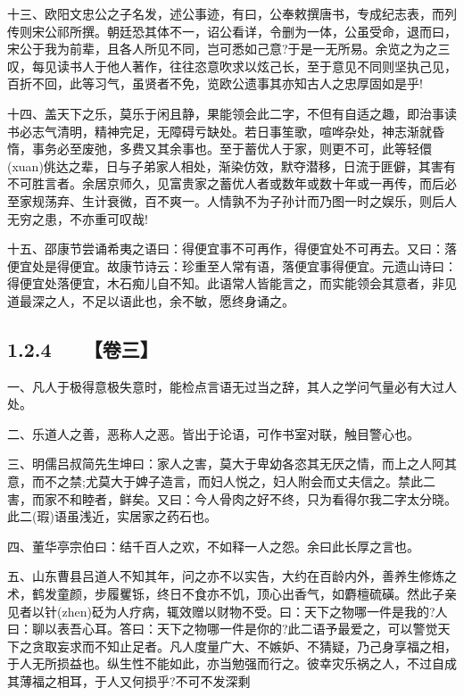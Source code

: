 \documentclass[letterpaper,12pt,english]{sphinxmanual}
\begin{document}
十三、欧阳文忠公之子名发，述公事迹，有曰，公奉敕撰唐书，专成纪志表，而列传则宋公祁所撰。朝廷恐其体不一，诏公看详，令删为一体，公虽受命，退而曰，宋公于我为前辈，且各人所见不同，岂可悉如己意?于是一无所易。余览之为之三叹，每见读书人于他人著作，往往恣意吹求以炫己长，至于意见不同则坚执己见，百折不回，此等习气，虽贤者不免，览欧公遗事其亦知古人之忠厚固如是乎!

十四、盖天下之乐，莫乐于闲且静，果能领会此二字，不但有自适之趣，即治事读书必志气清明，精神完足，无障碍亏缺处。若日事笙歌，喧哗杂处，神志渐就昏惰，事务必至废弛，多费又其余事也。至于蓄优人于家，则更不可，此等轻儇(xuan)佻达之辈，日与子弟家人相处，渐染仿效，默夺潜移，日流于匪僻，其害有不可胜言者。余居京师久，见富贵家之蓄优人者或数年或数十年或一再传，而后必至家规荡弃、生计衰微，百不爽一。人情孰不为子孙计而乃图一时之娱乐，则后人无穷之患，不亦重可叹哉!

十五、邵康节尝诵希夷之语曰：得便宜事不可再作，得便宜处不可再去。又曰：落便宜处是得便宜。故康节诗云：珍重至人常有语，落便宜事得便宜。元遗山诗曰：得便宜处落便宜，木石痴儿自不知。此语常人皆能言之，而实能领会其意者，非见道最深之人，不足以语此也，余不敏，愿终身诵之。


\subsection{1.2.4   【卷三】}
\label{\detokenize{p00_u5176_u5b83/_u300a_u5f20_u82f1-_u806a_u8bad_u658b_u8bed_u300b_u300a_u5f20_u5ef7_u7389-_u6f84_u6000_u56ed_u8bed_u300b_u5408_u8f91:id11}}
一、凡人于极得意极失意时，能检点言语无过当之辞，其人之学问气量必有大过人处。

二、乐道人之善，恶称人之恶。皆出于论语，可作书室对联，触目警心也。

三、明儒吕叔简先生坤曰：家人之害，莫大于卑幼各恣其无厌之情，而上之人阿其意，而不之禁;尤莫大于婢子造言，而妇人悦之，妇人附会而丈夫信之。禁此二害，而家不和睦者，鲜矣。又曰：今人骨肉之好不终，只为看得尔我二字太分晓。此二(瑕)语虽浅近，实居家之药石也。

四、董华亭宗伯曰：结千百人之欢，不如释一人之怨。余曰此长厚之言也。

五、山东曹县吕道人不知其年，问之亦不以实告，大约在百龄内外，善养生修炼之术，鹤发童颜，步履矍铄，终日不食亦不饥，顶心出香气，如麝檀硫磺。然此子亲见者以针(zhen)砭为人疗病，辄效赠以财物不受。曰：天下之物哪一件是我的?人曰：聊以表吾心耳。答曰：天下之物哪一件是你的?此二语予最爱之，可以警觉天下之贪取妄求而不知止足者。凡人度量广大、不嫉妒、不猜疑，乃己身享福之相，于人无所损益也。纵生性不能如此，亦当勉强而行之。彼幸灾乐祸之人，不过自成其薄福之相耳，于人又何损乎?不可不发深剩
\end{document}
